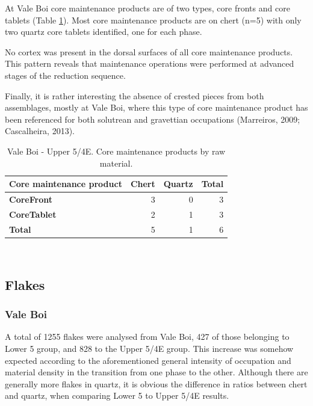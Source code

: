 \documentclass[12pt,twoside]{reedthesis}
\begin{document}
At Vale Boi core maintenance products are of two types, core fronts and core tablets (Table \ref{tab:corepreptypeVB}). Most core maintenance products are on chert (n=5) with only two quartz core tablets identified, one for each phase.

No cortex was present in the dorsal surfaces of all core maintenance products. This pattern reveals that maintenance operations were performed at advanced stages of the reduction sequence.

Finally, it is rather interesting the absence of crested pieces from both assemblages, mostly at Vale Boi, where this type of core maintenance product has been referenced for both solutrean and gravettian occupations (Marreiros, 2009; Cascalheira, 2013).
\begin{table}[!h]

\caption{\label{tab:corepreptypeVB}Vale Boi - Upper 5/4E. Core maintenance products by raw material.}
\centering
\fontsize{9}{11}\selectfont
\begin{tabular}[t]{>{\bfseries}lrrr}
\toprule
Core maintenance product & Chert & Quartz & Total\\
\midrule
CoreFront & 3 & 0 & 3\\
CoreTablet & 2 & 1 & 3\\
Total & 5 & 1 & 6\\
\bottomrule
\end{tabular}
\end{table}
~

\hypertarget{flakes}{%
\subsection{Flakes}\label{flakes}}

\hypertarget{vale-boi-5}{%
\subsubsection{Vale Boi}\label{vale-boi-5}}

A total of 1255 flakes were analysed from Vale Boi, 427 of those belonging to Lower 5 group, and 828 to the Upper 5/4E group. This increase was somehow expected according to the aforementioned general intensity of occupation and material density in the transition from one phase to the other. Although there are generally more flakes in quartz, it is obvious the difference in ratios between chert and quartz, when comparing Lower 5 to Upper 5/4E results.
\end{document}
